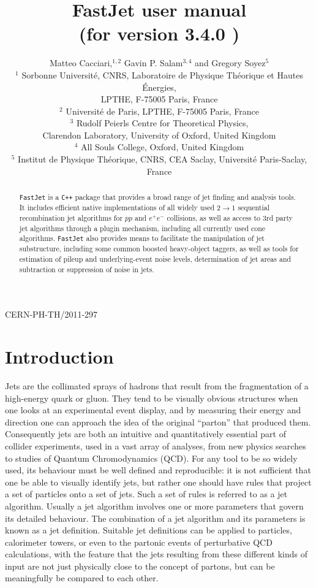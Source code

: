 \documentclass[12pt,a4]{article}
\title{\sf FastJet user manual%
  \\ \large (for version
  3.4.0%
  )
}
\author{Matteo Cacciari,$^{1,2}$ Gavin P. Salam$^{3,4}$ and Gregory Soyez$^{5}$\\[10pt]
  \normalsize
  $^1$ Sorbonne Universit\'e, CNRS, Laboratoire de Physique Th\'eorique et Hautes
  \'Energies,\\[-5pt] \normalsize LPTHE, F-75005 Paris, France\\
    \normalsize
  $^2$ Universit\'e de Paris, LPTHE, F-75005 Paris, France\\
  \normalsize
  $^3$ Rudolf Peierls Centre for Theoretical Physics,\\[-5pt]
  \normalsize
  Clarendon Laboratory, University of Oxford, United Kingdom\\
  \normalsize
  $^4$ All Souls College, Oxford, United Kingdom\\
  \normalsize
  $^5$ Institut de Physique Th\'eorique, CNRS, CEA Saclay, Universit\'e
  Paris-Saclay, France
}
\date{}
\newcommand{\fastjet}{\texttt{FastJet}\xspace}
\newcommand{\ttt}[1]{{\small\texttt{#1}}}
\begin{document}
\maketitle

\vspace{-10cm}
\begin{flushright}
  CERN-PH-TH/2011-297
\end{flushright}
\vspace{9cm}


\begin{abstract}

  \fastjet is a \ttt{C++} package that provides a broad range of jet
  finding and analysis tools.
  It includes efficient native implementations of all widely used $2\to 1$
  sequential recombination jet algorithms for $pp$ and $e^+e^-$
  collisions, as well as access to 3rd party jet algorithms through a
  plugin mechanism, including all currently used cone algorithms.
  \fastjet also provides means to facilitate the manipulation of jet
  substructure, including some common boosted heavy-object taggers, as
  well as tools for estimation of pileup and underlying-event noise
  levels, determination of jet areas and subtraction or suppression
  of noise in jets.

\end{abstract}

\newpage
\tableofcontents
\newpage

\section{Introduction}




Jets are the collimated sprays of hadrons that result from the
fragmentation of a high-energy quark or gluon.
%
They tend to be visually obvious structures when one looks at an
experimental event display, and by measuring their energy and
direction one can approach the idea of the original ``parton'' that
produced them.
%
Consequently jets are both an intuitive and quantitatively essential
part of collider experiments, used in a vast array of analyses, from
new physics searches to studies of Quantum Chromodynamics (QCD).
%
For any tool to be so widely used, its behaviour must be well defined
and reproducible: it is not sufficient that one be able to visually
identify jets, but rather one should have rules that project a set of
particles onto a set of jets.
%
Such a set of rules is referred to as a jet algorithm.
%
Usually a jet algorithm involves one or more parameters that govern
its detailed behaviour.
%
The combination of a jet algorithm and its parameters is known as a
jet definition.
%
Suitable jet definitions can be applied to particles,
calorimeter towers, or even to the partonic events of perturbative QCD
calculations, with the feature that the jets resulting from these
different kinds of input are not just physically close to the
concept of partons, but can be meaningfully be compared to each other.
\end{document}
